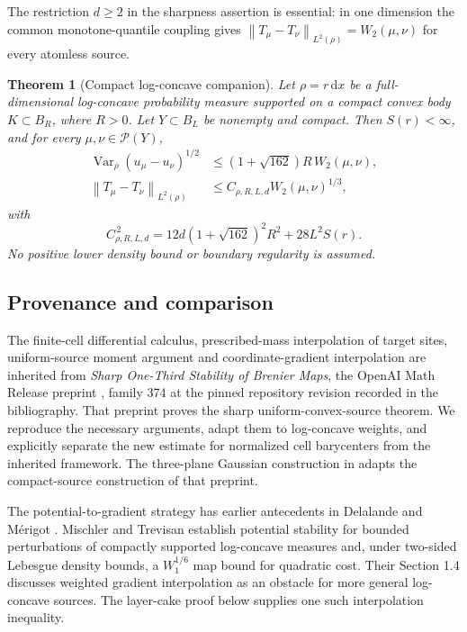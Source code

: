 \documentclass[11pt]{article}
\numberwithin{equation}{section}
\newtheorem{theorem}{Theorem}[section]
\theoremstyle{remark}
\newcommand{\Prob}{\mathcal P}
\newcommand{\Var}{\operatorname{Var}}
\newcommand{\dd}{\,\mathrm d}
\newcommand{\norm}[1]{\left\lVert #1\right\rVert}
\begin{document}
The restriction $d\ge2$ in the sharpness assertion is essential: in one dimension the common monotone-quantile coupling gives $\norm{T_\mu-T_\nu}_{L^2(\rho)}=W_2(\mu,\nu)$ for every atomless source.

\begin{theorem}[Compact log-concave companion]\label{thm:compact}
Let $\rho=r\dd x$ be a full-dimensional log-concave probability measure supported on a compact convex body $K\subset B_R$, where $R>0$. Let $Y\subset B_L$ be nonempty and compact. Then $S(r)<\infty$, and for every $\mu,\nu\in\Prob(Y)$,
\begin{align}
 \Var_\rho(u_\mu-u_\nu)^{1/2}
 &\le (1+\sqrt{162})R\,W_2(\mu,\nu),\label{eq:compact-potential}\\
 \norm{T_\mu-T_\nu}_{L^2(\rho)}
 &\le C_{\rho,R,L,d}W_2(\mu,\nu)^{1/3},\label{eq:compact-map}
\end{align}
with
\[
 C_{\rho,R,L,d}^{\,2}
 =12d(1+\sqrt{162})^2R^2+28L^2S(r).
\]
No positive lower density bound or boundary regularity is assumed.
\end{theorem}

\subsection{Provenance and comparison}
The finite-cell differential calculus, prescribed-mass interpolation of target sites, uniform-source moment argument and coordinate-gradient interpolation are inherited from \emph{Sharp One-Third Stability of Brenier Maps}, the OpenAI Math Release preprint \cite{OpenAI2026}, family 374 at the pinned repository revision recorded in the bibliography. That preprint proves the sharp uniform-convex-source theorem. We reproduce the necessary arguments, adapt them to log-concave weights, and explicitly separate the new estimate for normalized cell barycenters from the inherited framework. The three-plane Gaussian construction in  adapts the compact-source construction of that preprint.

The potential-to-gradient strategy has earlier antecedents in Delalande and M\'erigot \cite{DelalandeMerigot2023}. Mischler and Trevisan \cite[Theorems 1.1--1.2]{MischlerTrevisan2026} establish potential stability for bounded perturbations of compactly supported log-concave measures and, under two-sided Lebesgue density bounds, a $W_1^{1/6}$ map bound for quadratic cost. Their Section 1.4 discusses weighted gradient interpolation as an obstacle for more general log-concave sources. The layer-cake proof below supplies one such interpolation inequality.
\end{document}

